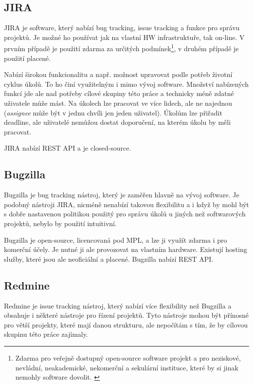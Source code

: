 \documentclass[thesis=B,czech]{FITthesis}[2012/06/26]
\begin{document}
		\subsection{JIRA}
			JIRA \cite{jira} je software, který nabízí bug tracking, issue tracking a funkce pro správu projektů. Je možné ho používat jak na vlastní HW infrastruktuře, tak on-line. V prvním případě je použití zdarma za určitých podmínek\footnote{Zdarma pro veřejně dostupný open-source software projekt\cite{jira-lic-opensource} a pro neziskové, nevládní, neakademické, nekomerční a sekulární instituce, které by si jinak nemohly software dovolit. \cite{jira-lic-nonprofit}}, v druhém případě je použití placené. 
			
			Nabízí širokou funkcionalitu a např. možnost upravovat podle potřeb životní cyklus úkolů. To ho činí využitelným i mimo vývoj software. Množství nabízených funkcí jde ale nad potřeby cílové skupiny této práce a technicky méně zdatné uživatele může mást. Na úkolech lze pracovat ve více lidech, ale ne najednou (\textit{assignee} může být v jednu chvíli jen jeden uživatel). Úkolům lze přiřadit deadline, ale uživatelé nemůžou dostat doporučení, na kterém úkolu by měli pracovat.
			
			JIRA nabízí REST API a je closed-source.
			
		\subsection{Bugzilla}
			Bugzilla \cite{bugzilla} je bug tracking nástroj, který je zaměřen hlavně na vývoj software. Je podobný nástroji JIRA, nicméně nenabízí takovou flexibilitu a i když by mohl být s dobře nastavenou politikou použitý pro správu úkolů u jiných než softwarových projektů, nebylo by použití intuitivní. 
			
			Bugzilla je open-source, licencovaná pod MPL, a lze ji využít zdarma i pro komerční účely. Je nutné ji ale provozovat na vlastním hardware. Existují hosting služby, které jsou ale neoficiální a placené. Bugzilla nabízí REST API.
			
		\subsection{Redmine}		
			Redmine \cite{redmine} je issue tracking nástroj, který nabízí více flexibility než Bugzilla a obsahuje i některé nástroje pro řízení projektů. Tyto nástroje mohou být přínosné pro větší projekty, které mají danou strukturu, ale nepočítám s tím, že by cílovou skupinu této práce zajímaly. 
			
\end{document}
